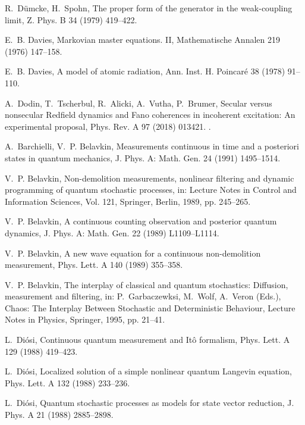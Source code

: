 \documentclass[3p,sort&compress]{elsarticle}
\begin{document}
\begin{thebibliography}{100}
R.~D{\"u}mcke, H.~Spohn, The proper form of the generator in the weak-coupling
  limit, Z. Phys. B 34 (1979) 419--422.

E.~B. Davies, Markovian master equations. {II}, Mathematische Annalen 219
  (1976) 147--158.

E.~B. Davies, A model of atomic radiation, Ann. Inst. H. Poincar{\'e} 38 (1978)
  91--110.

A.~Dodin, T.~Tscherbul, R.~Alicki, A.~Vutha, P.~Brumer, Secular versus
  nonsecular Redfield dynamics and Fano coherences in incoherent excitation: An
  experimental proposal, Phys. Rev. A 97 (2018) 013421.
\newblock \href {http://dx.doi.org/10.1103/PhysRevA.97.013421}
  {}.

A.~Barchielli, V.~P. Belavkin, Measurements continuous in time and a posteriori
  states in quantum mechanics, J. Phys. A: Math. Gen. 24 (1991) 1495--1514.

V.~P. Belavkin, Non-demolition measurements, nonlinear filtering and dynamic
  programming of quantum stochastic processes, in: Lecture Notes in Control and
  Information Sciences, Vol. 121, Springer, Berlin, 1989, pp. 245--265.

V.~P. Belavkin, A continuous counting observation and posterior quantum
  dynamics, J. Phys. A: Math. Gen. 22 (1989) L1109--L1114.

V.~P. Belavkin, A new wave equation for a continuous non-demolition
  measurement, Phys. Lett. A 140 (1989) 355--358.

V.~P. Belavkin, The interplay of classical and quantum stochastics: Diffusion,
  measurement and filtering, in: P.~Garbaczewksi, M.~Wolf, A.~Veron (Eds.),
  Chaos: The Interplay Between Stochastic and Deterministic Behaviour, Lecture
  Notes in Physics, Springer, 1995, pp. 21--41.

L.~Di{\'o}si, Continuous quantum measurement and {I}t{\^o} formalism, Phys.
  Lett. A 129 (1988) 419--423.

L.~Di{\'o}si, Localized solution of a simple nonlinear quantum {L}angevin
  equation, Phys. Lett. A 132 (1988) 233--236.

L.~Di{\'o}si, Quantum stochastic processes as models for state vector
  reduction, J. Phys. A 21 (1988) 2885--2898.


\end{thebibliography}
\end{document}
